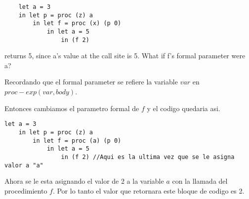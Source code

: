 \documentclass{article}
\begin{document}
\begin{lstlisting}
    let a = 3
    in let p = proc (z) a
        in let f = proc (x) (p 0)
            in let a = 5
                in (f 2)
\end{lstlisting}
returns 5, since a’s value at the call site is 5. What if f’s formal parameter were a?

Recordando que el formal parameter se refiere la variable $var$ en $proc-exp (var, body)$.

Entonces cambiamos el parametro formal de $f$ y el codigo quedaria asi.

\begin{lstlisting}
let a = 3
    in let p = proc (z) a
        in let f = proc (a) (p 0)
            in let a = 5
                in (f 2) //Aqui es la ultima vez que se le asigna valor a "a"
\end{lstlisting}

Ahora se le esta asignando el valor de 2 a la variable $a$ con la llamada del procedimiento $f$. Por lo tanto el valor que retornara este bloque de codigo es 2.
\end{document}
